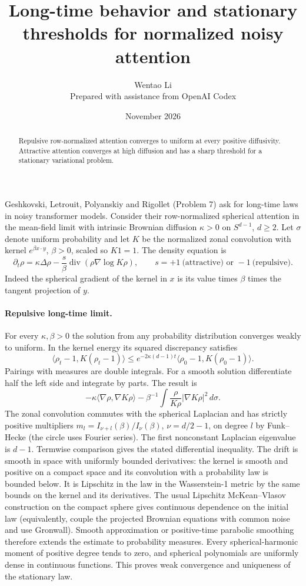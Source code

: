 \documentclass[10pt]{article}
\title{Long-time behavior and stationary thresholds for normalized noisy attention}
\author{Wentao Li\\{\small Prepared with assistance from OpenAI Codex}}
\date{November 2026}
\begin{document}
\maketitle
\begin{abstract}
Repulsive row-normalized attention converges to uniform at every positive diffusivity. Attractive attention converges at high diffusion and has a sharp threshold for a stationary variational problem.
\end{abstract}
Geshkovski, Letrouit, Polyanskiy and Rigollet (Problem 7) ask for long-time laws in noisy transformer models. Consider their row-normalized spherical attention in the mean-field limit with intrinsic Brownian diffusion $\kappa>0$ on $S^{d-1}$, $d\ge2$. Let $\sigma$ denote uniform probability and let $K$ be the normalized zonal convolution with kernel $e^{\beta x\cdot y}$, $\beta>0$, scaled so $K1=1$. The density equation is
\[
 \partial_t\rho=\kappa\Delta\rho-\frac{s}{\beta}\operatorname{div}(\rho\nabla\log K\rho),
 \qquad s=+1\ \text{(attractive) or }-1\ \text{(repulsive)}.
\]
Indeed the spherical gradient of the kernel in $x$ is its value times $\beta$ times the tangent projection of $y$.

\paragraph{Repulsive long-time limit.} For every $\kappa,\beta>0$ the solution from any probability distribution converges weakly to uniform. In the kernel energy its squared discrepancy satisfies
\[
 \langle\rho_t-1,K(\rho_t-1)\rangle\le e^{-2\kappa(d-1)t}
 \langle\rho_0-1,K(\rho_0-1)\rangle .
\]
Pairings with measures are double integrals. For a smooth solution differentiate half the left side and integrate by parts. The result is
\[
 -\kappa\langle\nabla\rho,\nabla K\rho\rangle-
 \beta^{-1}\int\frac{\rho}{K\rho}|\nabla K\rho|^2\,d\sigma.
\]
The zonal convolution commutes with the spherical Laplacian and has strictly positive multipliers $m_l=I_{\nu+l}(\beta)/I_\nu(\beta)$, $\nu=d/2-1$, on degree $l$ by Funk--Hecke (the circle uses Fourier series). The first nonconstant Laplacian eigenvalue is $d-1$. Termwise comparison gives the stated differential inequality. The drift is smooth in space with uniformly bounded derivatives: the kernel is smooth and positive on a compact space and its convolution with a probability law is bounded below. It is Lipschitz in the law in the Wasserstein-1 metric by the same bounds on the kernel and its derivatives. The usual Lipschitz McKean--Vlasov construction on the compact sphere gives continuous dependence on the initial law (equivalently, couple the projected Brownian equations with common noise and use Gronwall). Smooth approximation or positive-time parabolic smoothing therefore extends the estimate to probability measures. Every spherical-harmonic moment of positive degree tends to zero, and spherical polynomials are uniformly dense in continuous functions. This proves weak convergence and uniqueness of the stationary law.
\end{document}
